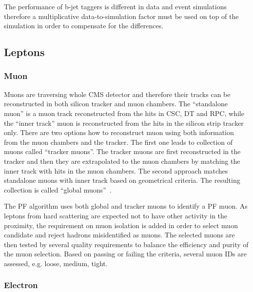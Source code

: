 The performance of b-jet taggers is different in data and event simulations therefore a multiplicative data-to-simulation factor must be used on top of the simulation in order to compensate for the differences.

\subsection{Leptons}

\subsubsection{Muon}

Muons are traversing whole CMS detector and therefore their tracks can be reconstructed in both silicon tracker and muon chambers. The ``standalone muon'' is a muon track reconstructed from the hits in CSC, DT and RPC, while the ``inner track'' muon is reconstructed from the hits in the silicon strip tracker only. There are two options how to reconstruct muon using both information from the muon chambers and the tracker. The first one leads to collection of muons called ``tracker muons''.  The tracker muons are first reconstructed in the tracker and then they are extrapolated to the muon chambers by matching the inner track with hits in the muon chambers. The second approach matches standalone muons with inner track based on geometrical criteria. The resulting collection is called ``global muons''~\cite{Chatrchyan:2012xi}. 

The PF algorithm uses both global and tracker muons to identify a PF muon. As leptons from hard scattering are expected not to have other activity in the proximity, the requirement on muon isolation is added in order to select muon candidate and reject hadrons misidentified as muons. The selected muons are then tested by several quality requirements to balance the efficiency and purity of the muon selection. Based on passing or failing the criteria, several muon IDs are assessed, e.g. loose, medium, tight. 


\subsubsection{Electron}

